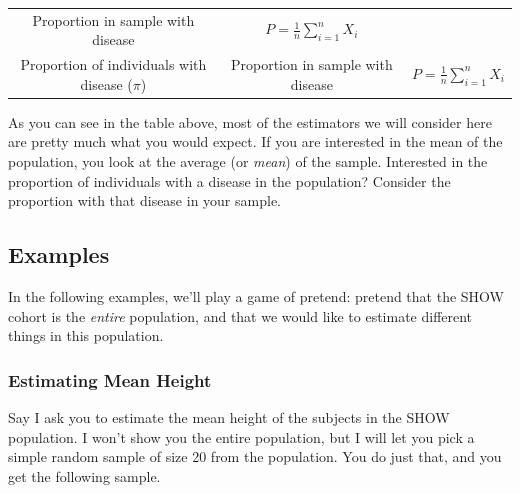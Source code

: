 \documentclass[]{book}
\theoremstyle{definition}
\theoremstyle{definition}
\theoremstyle{definition}
\theoremstyle{remark}
\begin{document}
\begin{longtable}[]{@{}ccc@{}}
\begin{minipage}[t]{0.21\columnwidth}
Proportion in sample with disease\strut
\end{minipage} & \begin{minipage}[t]{0.35\columnwidth}\centering
\(P = \frac{1}{n}\sum_{i=1}^n X_i\)\strut
\end{minipage}\tabularnewline
\begin{minipage}[t]{0.35\columnwidth}\centering
Proportion of individuals with disease (\(\pi\))\strut
\end{minipage} & \begin{minipage}[t]{0.21\columnwidth}\centering
Proportion in sample with disease\strut
\end{minipage} & \begin{minipage}[t]{0.35\columnwidth}\centering
\(P = \frac{1}{n}\sum_{i=1}^n X_i\)\strut
\end{minipage}\tabularnewline
\bottomrule
\end{longtable}

As you can see in the table above, most of the estimators we will consider here are pretty much what you would expect. If you are interested in the mean of the population, you look at the average (or \emph{mean}) of the sample. Interested in the proportion of individuals with a disease in the population? Consider the proportion with that disease in your sample.

\hypertarget{examples-5}{%
\subsection{Examples}\label{examples-5}}

In the following examples, we'll play a game of pretend: pretend that the SHOW cohort is the \emph{entire} population, and that we would like to estimate different things in this population.

\hypertarget{estimating-mean-height}{%
\subsubsection*{Estimating Mean Height}\label{estimating-mean-height}}

Say I ask you to estimate the mean height of the subjects in the SHOW population. I won't show you the entire population, but I will let you pick a simple random sample of size 20 from the population. You do just that, and you get the following sample.

\hypertarget{htmlwidget-f60428f63ee038fbf512}{}
\end{document}

